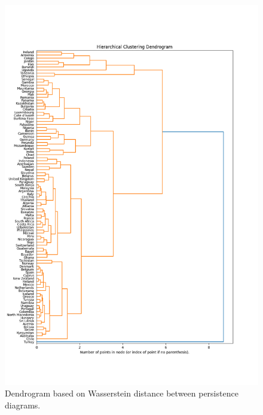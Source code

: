 \documentclass[12pt]{article}
\begin{document}
\begin{figure}[t]
	\centering
	\includegraphics[width=15cm]{wasserstein.png}
	\caption{Dendrogram based on Wasserstein distance between persistence diagrams.}
\end{figure}
\end{document}

